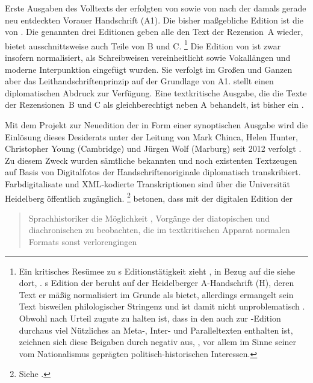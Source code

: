 Erste Ausgaben des Volltexts der \KC{} erfolgten von \citet{massmann:kukb}
sowie von \citet{diemer1849} nach der damals gerade neu entdeckten Vorauer
Handschrift (A1). Die bisher maßgebliche Edition ist die von
\citet{schroeder1895}. Die genannten drei Editionen geben alle den Text
der Rezension~A wieder, \citeauthor{massmann:kukb} bietet ausschnittsweise auch
Teile von B und C.%
%
	\footnote{Ein kritisches Resümee zu \citeauthor{massmann:kukb}s
		Editionstätigkeit zieht \citet{wolf2023}, in
		Bezug auf die \KC{} siehe dort, .
		\citeauthor{massmann:kukb}s Edition der \KC{} beruht auf der
		Heidelberger A-Handschrift (H), deren Text er mäßig normalisiert im
		Grunde als  bietet, allerdings ermangelt sein Text
		bisweilen philologischer Stringenz und ist damit nicht unproblematisch
		\autocite[125--126]{wolf2023}. Obwohl \citeauthor{massmann:kukb} nach
		 Urteil zugute zu halten ist, dass in den
		 auch zur \KC{}-Edition durchaus viel
		Nützliches an Meta-, Inter- und Paralleltexten
		enthalten ist, zeichnen sich diese Beigaben durch 
		negativ aus, ,
		vor allem im Sinne seiner vom Nationalismus geprägten
		politisch-historischen Interessen.%
	}
%
Die Edition von \citeauthor{schroeder1895} ist zwar insofern normalisiert, als
Schreibweisen vereinheitlicht sowie Vokal\-längen und moderne Interpunktion
eingefügt wurden. Sie verfolgt im Großen und Ganzen aber das
Leit\-handschriften\-prinzip auf der Grundlage von A1.
\citeauthor{diemer1849} stellt einen diplomatischen Abdruck zur Verfügung. Eine
textkritische Ausgabe, die die Texte der Rezensionen~B
und C als gleichberechtigt neben A behandelt, ist bisher ein .

Mit dem Projekt zur Neuedition der \KC{} in Form einer
synoptischen Ausgabe wird die Einlösung dieses Desiderats unter
der Leitung von Mark Chinca, Helen Hunter, Christopher Young (Cambridge) und
Jürgen Wolf (Marburg) seit 2012 verfolgt \autocite{chincaetal2019b}. Zu diesem
Zweck wurden sämtliche bekannten und noch existenten Textzeugen auf Basis von
Digitalfotos der Handschriften\-originale diplomatisch
transkribiert. Farb\-digitalisate und XML-ko\-dier\-te
Transkriptionen sind über die Universität Heidelberg
öffentlich zugänglich.%
%
	\footnote{Siehe \nocite{kcdigital}.}
%
\citet[287]{chincaetal2019b} betonen, dass mit der digitalen Edition der
\KC{} \blockquote{Sprachhistoriker \textelp{} die Möglichkeit ,
Vorgänge der dia\-topischen und dia\-chronischen
 zu beobachten, die im textkritischen Apparat normalen
Formats sonst verlorengingen}.

